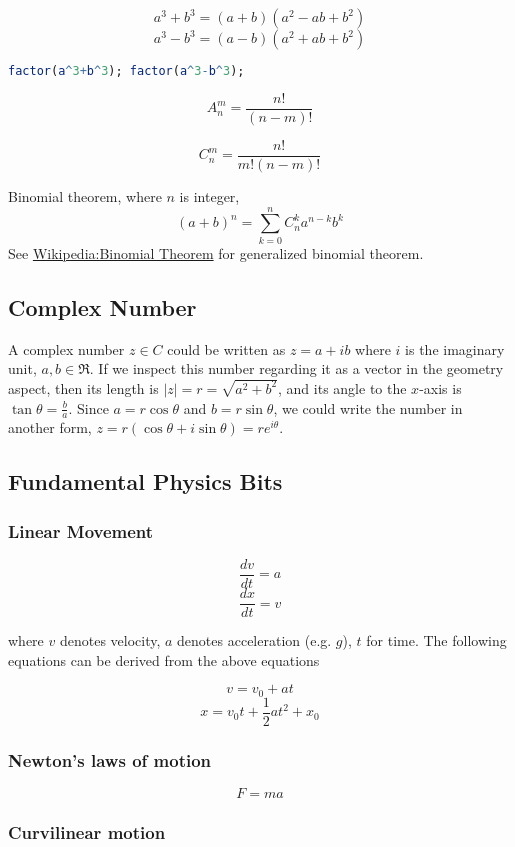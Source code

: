  \[ a^3 + b^3 = (a+b)(a^2-ab+b^2) \]
 \[ a^3 - b^3 = (a-b)(a^2+ab+b^2) \]
 
\begin{lstlisting}[language=Mathematica]
factor(a^3+b^3); factor(a^3-b^3);
\end{lstlisting}

 \[ A_n^m = \frac{n!}{(n-m)!}\]

 \[ C_n^m = \frac{n!}{m!(n-m)!}\]

 Binomial theorem, where $n$ is integer,
 \[ (a+b)^n = \sum_{k=0}^n C_n^k a^{n-k}b^k \]
 See \href{https://en.wikipedia.org/wiki/Binomial_theorem}
 {Wikipedia:Binomial Theorem} for generalized binomial theorem.

\subsection{Complex Number}
 A complex number $z\in C$ could be written as $z = a+ib$ where $i$ is the
 imaginary unit, $a,b\in\Re$. If we inspect this number regarding it as
 a vector in the geometry aspect, then its length is $|z| = r = \sqrt{a^2+b^2}$,
 and its angle to the $x$-axis is $\tan\theta=\frac{b}{a}$. Since $a=r\cos\theta$
 and $b=r\sin\theta$, we could write the number in another form,
 $z = r(\cos\theta + i\sin\theta) = re^{i\theta}$.

\subsection{Fundamental Physics Bits}

\subsubsection{Linear Movement}

$$ \frac{dv}{dt} = a $$
$$ \frac{dx}{dt} = v $$

where $v$ denotes velocity, $a$ denotes acceleration (e.g. $g$),
$t$ for time. The following equations can be derived from the
above equations

$$ v = v_0 + at $$
$$ x = v_0 t + \frac{1}{2}at^2 + x_0 $$

\subsubsection{Newton's laws of motion}

$$ F = ma $$

\subsubsection{Curvilinear motion}

